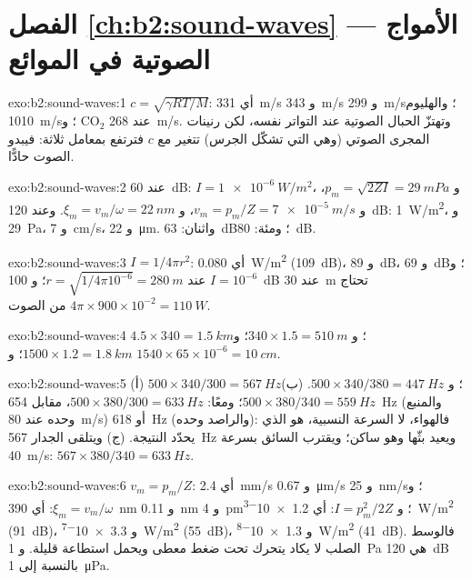 \section*{الفصل \ref{ch:b2:sound-waves} --- الأمواج الصوتية في الموائع}

\begin{solution}{exo:b2:sound-waves:1}
$c = \sqrt{\gamma RT/M}$: أي \qty{331}{m/s} و \qty{343}{m/s} و \qty{299}{m/s}؛ والهليوم
\qty{1010}{m/s}؛ و CO$_2$ عند \qty{268}{m/s}. وتهتزّ الحبال الصوتية عند التواتر
نفسه، لكن رنينات المجرى الصوتي (وهي التي تشكّل
الجرس) تتغير مع $c$ فترتفع بمعامل ثلاثة: فيبدو الصوت
حادًّا.
\end{solution}

\begin{solution}{exo:b2:sound-waves:2}
عند \qty{60}{dB}: $I = \qty{1e-6}{W/m^2}$، و $p_m = \sqrt{2ZI} = \qty{29}{mPa}$، و $v_m = p_m/Z =
\qty{7e-5}{m/s}$، و $\xi_m = v_m/\omega = \qty{22}{nm}$. وعند \qty{120}{dB}: \qty{1}{W/m^2}،
و \qty{29}{Pa}، و \qty{7}{cm/s}، و \qty{22}{\micro m}. واثنان: \qty{63}{dB}؛ ومئة: \qty{80}{dB}.
\end{solution}

\begin{solution}{exo:b2:sound-waves:3}
$I = 1/4\pi r^2$: أي \qty{0.080}{W/m^2} (\qty{109}{dB})، و \qty{89}{dB}، و \qty{69}{dB}؛ و $I = 10^{-6}$
عند $r = \sqrt{1/4\pi10^{-6}} = \qty{280}{m}$؛ و \qty{100}{dB} عند \qty{30}{m} تحتاج $4\pi \times
900 \times 10^{-2} = \qty{110}{W}$ من الصوت.
\end{solution}

\begin{solution}{exo:b2:sound-waves:4}
$4.5 \times 340 = \qty{1.5}{km}$؛ و $340 \times 1.5 = \qty{510}{m}$؛ و $1500 \times 1.2 = \qty{1.8}{km}$؛
و $1540 \times 65 \times 10^{-6} = \qty{10}{cm}$.
\end{solution}

\begin{solution}{exo:b2:sound-waves:5}
(أ) $500 \times 340/300 = \qty{567}{Hz}$؛ و $500 \times 340/380 = \qty{447}{Hz}$. (ب) $500 \times
380/340 = \qty{559}{Hz}$؛ ومعًا: $500 \times 380/300 = \qty{633}{Hz}$، مقابل \qty{654}{Hz}
(والمنبع وحده عند \qty{80}{m/s}) أو \qty{618}{Hz} (والراصد وحده): فالهواء، لا
السرعة النسبية، هو الذي يحدّد النتيجة. (ج) ويتلقى الجدار \qty{567}{Hz}
ويعيد بثّها وهو ساكن؛ ويقترب السائق بسرعة \qty{40}{m/s}: $567 \times
380/340 = \qty{633}{Hz}$.
\end{solution}

\begin{solution}{exo:b2:sound-waves:6}
$v_m = p_m/Z$: أي \qty{2.4}{mm/s} و \qty{0.67}{\micro m/s} و \qty{25}{nm/s}؛ و $\xi_m = v_m/\omega$:
أي \qty{390}{nm} و \qty{0.11}{nm} و \qty{4}{pm}؛ و $I = p_m^2/2Z$: أي \qty{1.2e-3}{W/m^2} (\qty{91}{dB})،
و \qty{3.3e-7}{W/m^2} (\qty{55}{dB})، و \qty{1.3e-8}{W/m^2} (\qty{41}{dB}). فالوسط الصلب
لا يكاد يتحرك تحت ضغط معطى ويحمل استطاعة قليلة.
و \qty{1}{Pa} هي \qty{120}{dB} بالنسبة إلى \qty{1}{\micro Pa}.
\end{solution}

